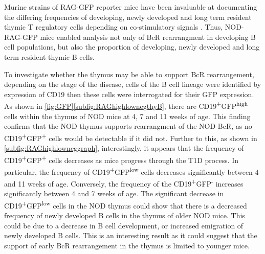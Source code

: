 Murine strains of RAG-GFP reporter mice have been invaluable at documenting the differing frequencies of developing, newly developed and long term resident thymic T regulatory cells depending on co-stimulatory signals \citep{Cuss2012}.
Thus, NOD-RAG-GFP mice enabled analysis not only of BcR rearrangment in developing B cell populations, but also the proportion of developing, newly developed and long term resident thymic B cells.

To investigate whether the thymus may be able to support BcR rearrangement, depending on the stage of the disease, cells of the B cell lineage were identified by expression of CD19 then these cells were interrogated for their GFP expression.
As shown in \cref{fig:GFP}\ref{subfig:RAGhighlownegthyB}, there are CD19\textsuperscript{+}GFP\textsuperscript{high} cells within the thymus of NOD mice at 4, 7 and 11 weeks of age.
This finding confirms that the NOD thymus supports rearrangment of the NOD BcR, as no CD19\textsuperscript{+}GFP\textsuperscript{+} cells would be detectable if it did not.
Further to this, as shown in \cref{subfig:RAGhighlowneggraph}, interestingly, it appears that the frequency of CD19\textsuperscript{+}GFP\textsuperscript{+} cells decreases as mice progress through the T1D process.
In particular, the frequency of CD19\textsuperscript{+}GFP\textsuperscript{low} cells decreases significantly between 4 and 11 weeks of age.
Conversely, the frequency of the CD19\textsuperscript{+}GFP\textsuperscript{-} increases significantly between 4 and 7 weeks of age.
The significant decrease in CD19\textsuperscript{+}GFP\textsuperscript{low} cells in the NOD thymus could show that there is a decreased frequency of newly developed B cells in the thymus of older NOD mice.
This could be due to a decrease in B cell development, or increased emigration of newly developed B cells.
This is an interesting result as it could suggest that the support of early BcR rearrangement in the thymus is limited to younger mice.




